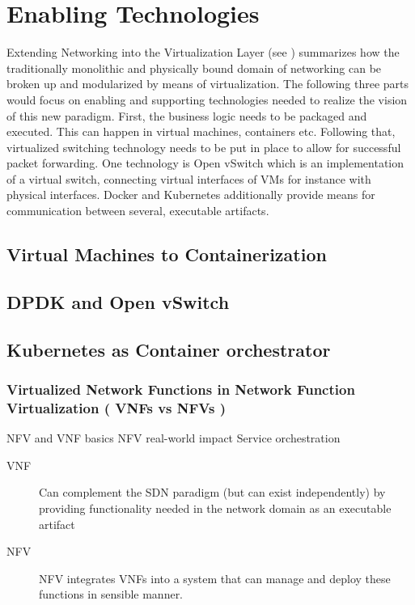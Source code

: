 



\section{Enabling Technologies}
Extending Networking into the Virtualization Layer (see \cite{pfaff2009extending}) summarizes how the traditionally monolithic and physically bound domain of networking can be broken up and modularized by means of virtualization. The following three parts would focus on enabling and supporting technologies needed to realize the vision of this new paradigm. First, the business logic needs to be packaged and executed. This can happen in virtual machines, containers etc. Following that, virtualized switching technology needs to be put in place to allow for successful packet forwarding. One technology is Open vSwitch which is an implementation of a virtual switch, connecting virtual interfaces of VMs for instance with physical interfaces. Docker and Kubernetes additionally provide means for communication between several, executable artifacts.
\subsection{Virtual Machines to Containerization}
\subsection{DPDK and Open vSwitch}
\subsection{Kubernetes as Container orchestrator}

\quad


\subsubsection{Virtualized Network Functions in Network Function Virtualization ( VNFs vs NFVs )}
NFV and VNF basics \cite{mijumbi2016network} NFV real-world impact \cite{bilal2016impact} Service orchestration \cite{de2019network}

\begin{description}
	\item [VNF] Can complement the SDN paradigm (but can exist independently)  by providing functionality needed in the network domain as an executable artifact
	\item [NFV] NFV integrates VNFs into a system that can manage and deploy these functions in sensible manner. 
\end{description}
